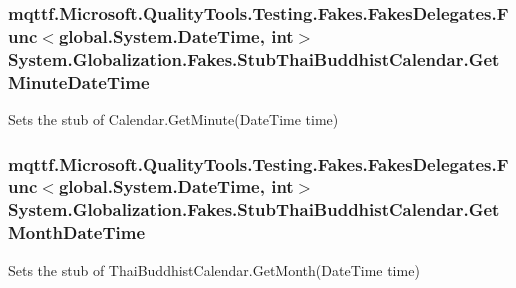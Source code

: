 \hypertarget{class_system_1_1_globalization_1_1_fakes_1_1_stub_thai_buddhist_calendar_a64530bedfc3b0744b525a11509d32cee}{
\subsubsection[{Get\-Minute\-Date\-Time}]{\setlength{\rightskip}{0pt plus 5cm}mqttf.\-Microsoft.\-Quality\-Tools.\-Testing.\-Fakes.\-Fakes\-Delegates.\-Func$<$global.\-System.\-Date\-Time, int$>$ System.\-Globalization.\-Fakes.\-Stub\-Thai\-Buddhist\-Calendar.\-Get\-Minute\-Date\-Time}}\label{class_system_1_1_globalization_1_1_fakes_1_1_stub_thai_buddhist_calendar_a64530bedfc3b0744b525a11509d32cee}


Sets the stub of Calendar.\-Get\-Minute(\-Date\-Time time)

\hypertarget{class_system_1_1_globalization_1_1_fakes_1_1_stub_thai_buddhist_calendar_a66e294acd95f0295877147daa25cb795}{
\subsubsection[{Get\-Month\-Date\-Time}]{\setlength{\rightskip}{0pt plus 5cm}mqttf.\-Microsoft.\-Quality\-Tools.\-Testing.\-Fakes.\-Fakes\-Delegates.\-Func$<$global.\-System.\-Date\-Time, int$>$ System.\-Globalization.\-Fakes.\-Stub\-Thai\-Buddhist\-Calendar.\-Get\-Month\-Date\-Time}}\label{class_system_1_1_globalization_1_1_fakes_1_1_stub_thai_buddhist_calendar_a66e294acd95f0295877147daa25cb795}


Sets the stub of Thai\-Buddhist\-Calendar.\-Get\-Month(\-Date\-Time time)

